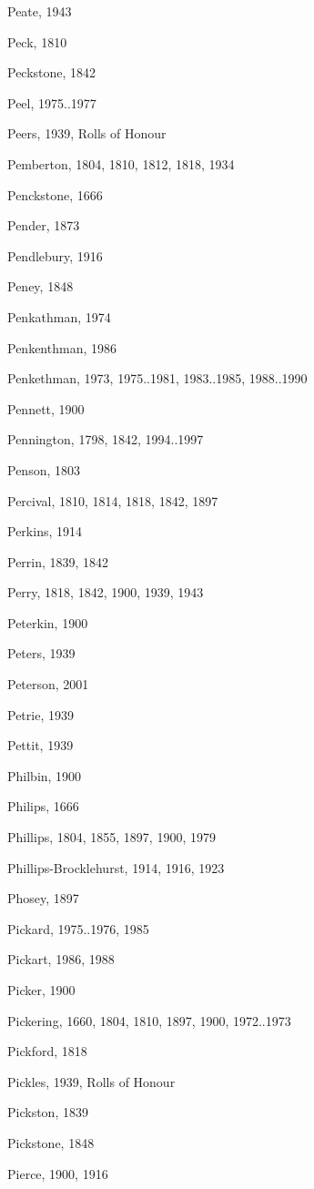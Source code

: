 \begin{theindex}
\item Peate, 1943
\item Peck, 1810
\item Peckstone, 1842
\item Peel, 1975..1977
\item Peers, 1939, Rolls of Honour
\item Pemberton, 1804, 1810, 1812, 1818, 1934
\item Penckstone, 1666
\item Pender, 1873
\item Pendlebury, 1916
\item Peney, 1848
\item Penkathman, 1974
\item Penkenthman, 1986
\item Penkethman, 1973, 1975..1981, 1983..1985, 1988..1990
\item Pennett, 1900
\item Pennington, 1798, 1842, 1994..1997
\item Penson, 1803
\item Percival, 1810, 1814, 1818, 1842, 1897
\item Perkins, 1914
\item Perrin, 1839, 1842
\item Perry, 1818, 1842, 1900, 1939, 1943
\item Peterkin, 1900
\item Peters, 1939
\item Peterson, 2001
\item Petrie, 1939
\item Pettit, 1939
\item Philbin, 1900
\item Philips, 1666
\item Phillips, 1804, 1855, 1897, 1900, 1979
\item Phillips-Brocklehurst, 1914, 1916, 1923
\item Phosey, 1897
\item Pickard, 1975..1976, 1985
\item Pickart, 1986, 1988
\item Picker, 1900
\item Pickering, 1660, 1804, 1810, 1897, 1900, 1972..1973
\item Pickford, 1818
\item Pickles, 1939, Rolls of Honour
\item Pickston, 1839
\item Pickstone, 1848
\item Pierce, 1900, 1916

\end{theindex}
